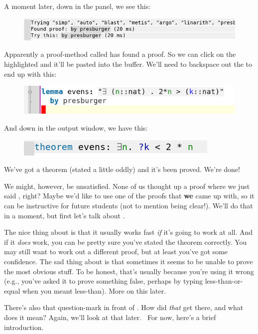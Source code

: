 A moment later, down in the  panel, we see this:
\begin{figure}[H]
    \includegraphics[width=0.75\linewidth]{C01//Images/try0-results.png}
\end{figure}

Apparently a proof-method called  has found a proof. So we can click on the highlighted  and it'll be pasted into the buffer. We'll need to backspace out the  to end up with this:
\begin{figure}[h]
    \includegraphics[width=0.5\linewidth]{C01/Images/first-proof.png}
\end{figure}
And down in the output window, we have this:
\begin{figure}[h]
    \includegraphics[width=0.5\linewidth]{C01/Images/output-first-proof.png}
\end{figure}

We've got a theorem (stated a little oddly) and it's been proved. We're done! 

We might, however, be unsatisfied. None of us thought up a proof where we just said , right? Maybe we'd like to use one of the proofs that \textbf{we} came up with, so it can be instructive for future students (not to mention being clear!). We'll do that in a moment, but first let's talk about .

The nice thing about  is that it usually works fast \textit{if} it's going to work at all. And if it \textit{does} work, you can be pretty sure you've stated the theorem correctly. You may still want to work out a different proof, but at least you've got some confidence. The sad thing about  is that sometimes it seems to be unable to prove the most obvious stuff. To be honest, that's usually because you're using it wrong (e.g., you've asked it to prove something false, perhaps by typing less-than-or-equal when you meant less-than). More on this later. 

There's also that question-mark in front of . How did \textit{that} get there, and what does it mean? Again, we'll look at that later.  For now, here's a brief introduction.

